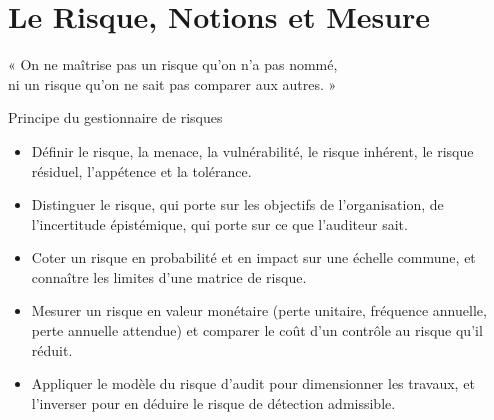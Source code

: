 
\chapter{Le Risque, Notions et Mesure}
\label{chap:risque}

\epigraph{%
    « On ne maîtrise pas un risque qu'on n'a pas nommé,\\
    ni un risque qu'on ne sait pas comparer aux autres. »%
}{Principe du gestionnaire de risques}


\begin{boxobjectifs}
\begin{itemize}
    \item Définir le risque, la menace, la vulnérabilité, le risque inhérent,
          le risque résiduel, l'appétence et la tolérance.
    \item Distinguer le risque, qui porte sur les objectifs de
          l'organisation, de l'incertitude épistémique, qui porte sur ce que
          l'auditeur sait.
    \item Coter un risque en probabilité et en impact sur une échelle
          commune, et connaître les limites d'une matrice de risque.
    \item Mesurer un risque en valeur monétaire (perte unitaire, fréquence
          annuelle, perte annuelle attendue) et comparer le coût d'un
          contrôle au risque qu'il réduit.
    \item Appliquer le modèle du risque d'audit pour dimensionner les
          travaux, et l'inverser pour en déduire le risque de détection
          admissible.
\end{itemize}
\end{boxobjectifs}

